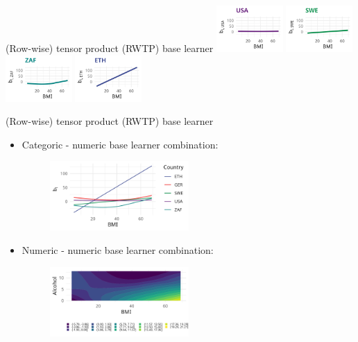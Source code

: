 \documentclass[t,10pt]{beamer}
\begin{document}
\begin{frame}{(Row-wise) tensor product (RWTP) base learner}
  {\includegraphics[width=0.19\textwidth]{figures/bs-tensor/fig-tensor-USA.png}}
  \includegraphics[width=0.19\textwidth]{figures/bs-tensor/fig-tensor-SWE.png}
  {\includegraphics[width=0.19\textwidth]{figures/bs-tensor/fig-tensor-ZAF.png}}
  {\includegraphics[width=0.19\textwidth]{figures/bs-tensor/fig-tensor-ETH.png}}
  \addtocounter{framenumber}{-1}
\end{frame}

\begin{frame}{(Row-wise) tensor product (RWTP) base learner}
  \begin{itemize}
    \item Categoric - numeric base learner combination:
      \begin{figure}
        \centering
        \includegraphics[width=0.5\textwidth]{figures/bs-tensor/fig-cat-num.png}
      \end{figure}
    \item Numeric - numeric base learner combination:
      \begin{figure}
        \centering
        \includegraphics[width=0.5\textwidth]{figures/bs-tensor/fig-num-num.png}
      \end{figure}
  \end{itemize}
\end{frame}
\end{document}
